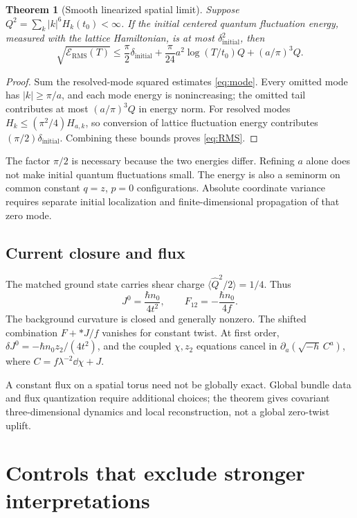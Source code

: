 \documentclass[11pt]{article}
\newtheorem{theorem}{Theorem}[section]
\begin{document}
\begin{theorem}[Smooth linearized spatial limit]\label{thm:linear}
Suppose
$Q^2=\sum_k|k|^6H_k(t_0)<\infty$.
If the initial centered quantum fluctuation energy, measured with the lattice Hamiltonian, is at most $\delta_{\mathrm{initial}}^2$, then
\begin{equation}\label{eq:RMS}
\boxed{\sqrt{\mathcal E_{\mathrm{RMS}}(T)}
\le\frac\pi2\delta_{\mathrm{initial}}
+\frac{\pi}{24}a^2\log(T/t_0)Q
+(a/\pi)^3Q.}
\end{equation}
\end{theorem}
\begin{proof}
Sum the resolved-mode squared estimates \eqref{eq:mode}. Every omitted mode has $|k|\ge\pi/a$, and each mode energy is nonincreasing; the omitted tail contributes at most $(a/\pi)^3Q$ in energy norm. For resolved modes $H_k\le(\pi^2/4)H_{a,k}$, so conversion of lattice fluctuation energy contributes $(\pi/2)\delta_{\mathrm{initial}}$. Combining these bounds proves \eqref{eq:RMS}.
\end{proof}
The factor $\pi/2$ is necessary because the two energies differ. Refining $a$ alone does not make initial quantum fluctuations small. The energy is also a seminorm on common constant $q=z$, $p=0$ configurations. Absolute coordinate variance requires separate initial localization and finite-dimensional propagation of that zero mode.

\subsection{Current closure and flux}
The matched ground state carries shear charge $\langle\widehat Q^2/2\rangle=1/4$. Thus
\[
J^0=\frac{\hbar n_0}{4t^2},\qquad
F_{12}=-\frac{\hbar n_0}{4f}.
\]
The background curvature is closed and generally nonzero. The shifted combination $F+*J/f$ vanishes for constant twist. At first order,
$\delta J^0=-\hbar n_0z_2/(4t^2)$, and the coupled $\chi,z_2$ equations cancel in
$\partial_a(\sqrt{-h}\,C^a)$, where $C=f\lambda^{-2}\dd\chi+J$.

A constant flux on a spatial torus need not be globally exact. Global bundle data and flux quantization require additional choices; the theorem gives covariant three-dimensional dynamics and local reconstruction, not a global zero-twist uplift.

\section{Controls that exclude stronger interpretations}
\end{document}
